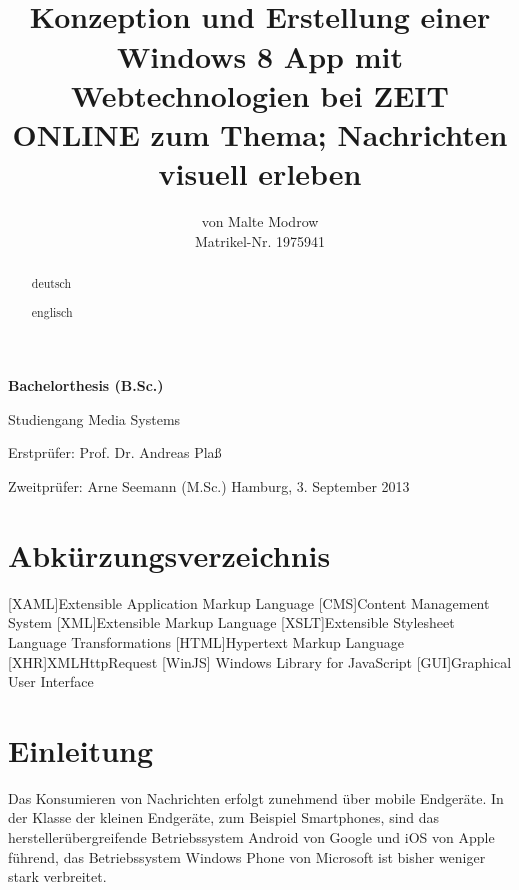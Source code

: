 \documentclass[12pt,a4paper,bibtotoc,abstracton]{scrartcl}
\author{von Malte Modrow \\ Matrikel-Nr. 1975941}
\title{\HRule \\ Konzeption und Erstellung einer Windows 8 App mit Webtechnologien bei ZEIT ONLINE zum Thema; Nachrichten visuell erleben \HRule}
\date{}
\begin{document}
\pagestyle{empty}
\maketitle

\begin{center}		
	\LARGE
	\textbf{Bachelorthesis (B.Sc.)}
	
	\Large 
	Studiengang Media Systems 
	
	\vfill	
	\large
  	Erstprüfer: Prof. Dr. Andreas Plaß
	
	Zweitprüfer: Arne Seemann (M.Sc.)
	\vfill
	Hamburg, 3. September 2013	
\end{center}

\newpage
{}
\begin{abstract}
	deutsch
\end{abstract}

\begin{abstract}
	englisch
\end{abstract}

\newpage
\tableofcontents

\newpage
\thispagestyle{plain}
\listoffigures

\vspace{2cm}
\listoftables

\newpage
\thispagestyle{plain}
\renewcommand\lstlistlistingname{Listingsverzeichnis}
\lstlistoflistings
\vspace{2cm}
\section*{Abkürzungsverzeichnis}
\label{sec:abkürzungen}
\begin{acronym}[SEPSEP]
	[XAML]{Extensible Application Markup Language}
	 [CMS]{Content Management System}
	 [XML]{Extensible Markup Language}
	[XSLT]{Extensible Stylesheet Language Transformations}
	[HTML]{Hypertext Markup Language}
	[XHR]{XMLHttpRequest}
	[WinJS] {Windows Library for JavaScript}
	[GUI]{Graphical User Interface}
\end{acronym}

\pagestyle{headings}


\newpage
{}
\setcounter{page}{1}
\section{Einleitung}
\label{sec:einleitung}
Das Konsumieren von Nachrichten erfolgt zunehmend über mobile Endgeräte. 
In der Klasse der kleinen Endgeräte, zum Beispiel Smartphones, sind das herstellerübergreifende  Betriebssystem Android von Google und iOS von Apple führend, das Betriebssystem Windows Phone von Microsoft ist bisher weniger stark verbreitet.
\end{document}
